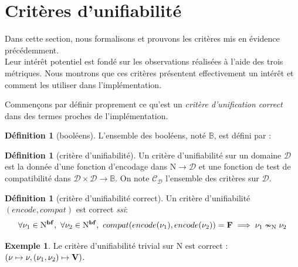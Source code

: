 \documentclass[a4paper]{report}
\theoremstyle{definition}
\newtheorem{definition}[theoreme]{Définition}
\newtheorem{exemple}[theoreme]{Exemple}
\newcommand{\ssi}{\textit{ssi}\xspace}
\newcommand{\N}{\mathrm{N}}
\newcommand\gab[1]{{\bf\color{Orange}{TODO: #1}}\\}
\begin{document}
{%

\section{Critères d'unifiabilité}

Dans cette section, nous formalisons et prouvons les critères mis en évidence précédemment.\gab{Justement, pas vraiment. On a une définition pour la tête, mais pour le reste, on a seulement une vague intuition}
Leur intérêt potentiel est fondé sur les observations réalisées à l'aide des trois métriques. Nous montrons que ces critères présentent effectivement un intérêt et comment les utiliser dans l'implémentation.

Commençons par définir proprement ce qu'est un \emph{critère d'unification correct} dans des termes proches de l'implémentation.

\begin{definition}[booléens]
  L'ensemble des booléens, noté $\mathbb{B}$, est défini par :
\end{definition}

\begin{definition}[critère d'unifiabilité]
  Un critère d'unifiabilité sur un domaine $\mathscr{D}$ est la donnée d'une fonction d'encodage dans $\N \rightarrow \mathscr{D}$ et une fonction de test de compatibilité dans $\mathscr{D} \times \mathscr{D} \rightarrow \mathbb{B}$. On note $\mathscr{C}_\mathscr{D}$ l'ensemble des critères sur $\mathscr{D}$.
\end{definition}

\begin{definition}[critère d'unifiabilité correct]
  Un critère d'unifiabilité $(encode, compat)$ est correct \ssi :
  \[ \forall \nu_1 \in \N^{\bold{bf}},\ \forall \nu_2 \in \N^{\bold{bf}},\ compat (encode (\nu_1), encode (\nu_2)) = \bold{F} \implies \nu_1 \nsim_\N \nu_2 \]
\end{definition}

\begin{exemple}
  Le critère d'unifiabilité trivial sur $\N$ est correct : $(\nu \mapsto \nu, (\nu_1, \nu_2) \mapsto \bold{V})$.
\end{exemple}

}
\end{document}
